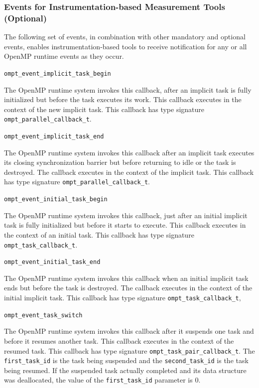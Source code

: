 \documentclass{article}
\newcommand{\descheader}[1]{{\needspace{3\baselineskip}\vspace{1em}\noindent \fbox{#1}}}
\begin{document}
\subsubsection{Events for Instrumentation-based Measurement Tools (Optional)}
The following set of events, in combination with other mandatory and optional events, 
enables instrumentation-based tools to receive notification for any or all OpenMP runtime events as they occur.

\descheader{Task Creation and Destruction}

\begin{description}
\sloppy

\item \verb|ompt_event_implicit_task_begin|

   The OpenMP runtime system invokes this callback,
after an
   implicit task is fully initialized but before the task executes
   its work. This callback executes in the context of the new implicit
   task.
   This callback has type signature \verb|ompt_parallel_callback_t|. 

\item \verb|ompt_event_implicit_task_end|
 
   The OpenMP runtime system invokes this callback after an implicit
   task executes its closing synchronization barrier but before
   returning to idle or the task is destroyed.  The callback
   executes in the context of the implicit task.
   This callback has type signature \verb|ompt_parallel_callback_t|.
   

\item \verb|ompt_event_initial_task_begin|

   The OpenMP runtime system invokes this callback,
just after an initial
   implicit task is fully initialized but before it starts to execute. This callback executes in the context of an initial 
   task.
   This callback has type signature \verb|ompt_task_callback_t|. 

\item \verb|ompt_event_initial_task_end|
 
   The OpenMP runtime system invokes this callback when an initial implicit
   task ends but before the task is destroyed.  The callback
   executes in the context of the initial implicit task.
   This callback has type signature \verb|ompt_task_callback_t|,

\item \verb|ompt_event_task_switch|

 The OpenMP runtime system invokes this callback after it
 suspends one task and before it resumes another task.  This
 callback executes in the context of the resumed task.  
  This callback has type signature \verb|ompt_task_pair_callback_t|. 
  The \verb|first_task_id| is the task being suspended and the \verb|second_task_id| is the task being resumed.
  If the suspended task actually completed and its data structure was
 deallocated, the value of the  \verb|first_task_id| parameter is 0.


\end{description}
\end{document}
